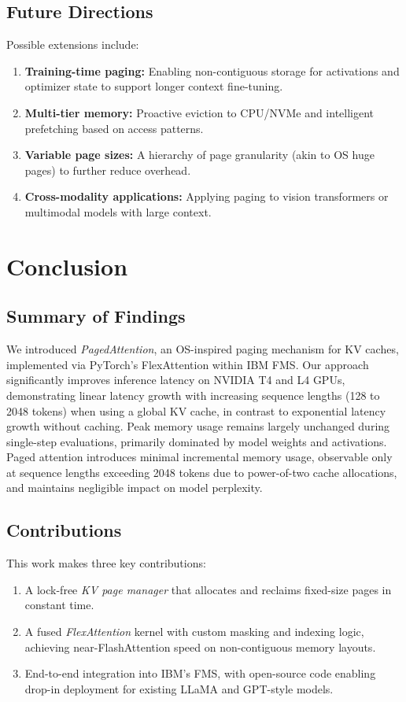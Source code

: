 \documentclass[conference]{IEEEtran}
\begin{document}
\subsection{Future Directions}\label{ssec:future}
Possible extensions include:
\begin{enumerate}
  \item \textbf{Training-time paging:} Enabling non-contiguous storage for activations and optimizer state to support longer context fine-tuning.
  \item \textbf{Multi-tier memory:} Proactive eviction to CPU/NVMe and intelligent prefetching based on access patterns.
  \item \textbf{Variable page sizes:} A hierarchy of page granularity (akin to OS huge pages) to further reduce overhead.
  \item \textbf{Cross-modality applications:} Applying paging to vision transformers or multimodal models with large context.
\end{enumerate}


\section{Conclusion}\label{sec:conclusion}

\subsection{Summary of Findings}
We introduced \emph{PagedAttention}, an OS-inspired paging mechanism for KV caches, implemented via PyTorch's FlexAttention within IBM FMS. Our approach significantly improves inference latency on NVIDIA T4 and L4 GPUs, demonstrating linear latency growth with increasing sequence lengths (128 to 2048 tokens) when using a global KV cache, in contrast to exponential latency growth without caching. Peak memory usage remains largely unchanged during single-step evaluations, primarily dominated by model weights and activations. Paged attention introduces minimal incremental memory usage, observable only at sequence lengths exceeding 2048 tokens due to power-of-two cache allocations, and maintains negligible impact on model perplexity.


\subsection{Contributions}
This work makes three key contributions:
\begin{enumerate}[leftmargin=*]
  \item A lock-free \emph{KV page manager} that allocates and reclaims fixed-size pages in constant time.
  \item A fused \emph{FlexAttention} kernel with custom masking and indexing logic, achieving near-FlashAttention speed on non-contiguous memory layouts.
  \item End-to-end integration into IBM's FMS, with open-source code enabling drop-in deployment for existing LLaMA and GPT-style models.
\end{enumerate}
\end{document}
